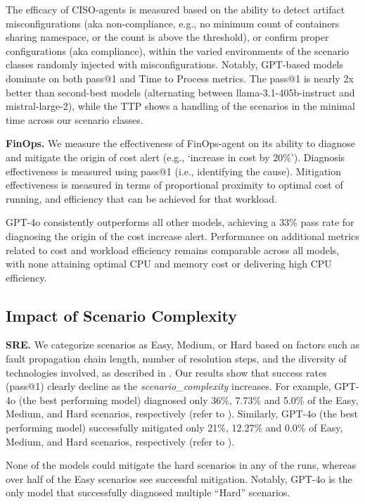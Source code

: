 The efficacy of CISO-agents is measured based on the ability to detect artifact misconfigurations (aka non-compliance, e.g., no minimum count of containers sharing namespace, or the count is above the threshold), or confirm proper configurations (aka compliance), within the varied environments of the scenario classes randomly injected with misconfigurations. 
Notably, GPT-based models dominate on both pass@1 and Time to Process metrics. The pass@1 is nearly 2x better than second-best models (alternating between llama-3.1-405b-instruct and mistral-large-2), while the TTP shows a handling of the scenarios in the minimal time across our scenario classes.

\textbf{FinOps.}
We measure the effectiveness of FinOps-agent on its ability to diagnose and mitigate the origin of cost alert (e.g., `increase in cost by 20\%'). 
Diagnosis effectiveness is measured using pass@1 (i.e., identifying the cause).
Mitigation effectiveness is measured in terms of proportional proximity to optimal cost of running, and efficiency that can be achieved for that workload.

GPT-4o consistently outperforms all other models, achieving a 33\% pass rate for diagnosing the origin of the cost increase alert. 
Performance on additional metrics related to cost and workload efficiency remains comparable across all models, with none attaining optimal CPU and memory cost or delivering high CPU efficiency. 



\subsection{Impact of Scenario Complexity}
\textbf{SRE.}
    We categorize scenarios as Easy, Medium, or Hard based on factors such as fault propagation chain length, number of resolution steps, and the diversity of technologies involved, as described in . 
    Our results show that success rates (pass@1) clearly decline as the \textit{scenario\_complexity} increases.
    For example, GPT-4o (the best performing model) diagnosed only 36\%, 7.73\% and 5.0\% of the Easy, Medium, and Hard scenarios, respectively (refer to ).
    Similarly, GPT-4o (the best performing model) successfully mitigated only 21\%, 12.27\% and 0.0\% of Easy, Medium, and Hard scenarios, respectively 
    (refer to ). 
    
    None of the models could mitigate the hard scenarios in any of the runs, whereas over half of the Easy scenarios see successful mitigation. 
    Notably, GPT-4o is the only model that successfully diagnosed multiple ``Hard'' scenarios. 
      

